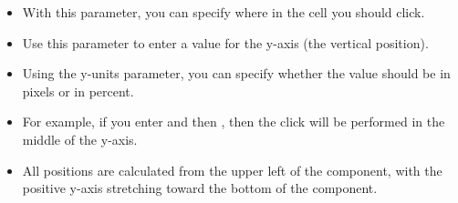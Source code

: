 % 
\begin{itemize}
\item With this parameter, you can specify where in the cell you should click.
\item Use this parameter to enter a value for the y-axis (the vertical position).
\item Using the y-units parameter, you can specify whether the value should be in pixels or in percent. 
\item For example, if you enter  and then , then the click will be performed in the middle of the y-axis.
\item All positions are calculated from the upper left of the component, with the positive y-axis stretching toward the bottom of the component.
\end{itemize}

